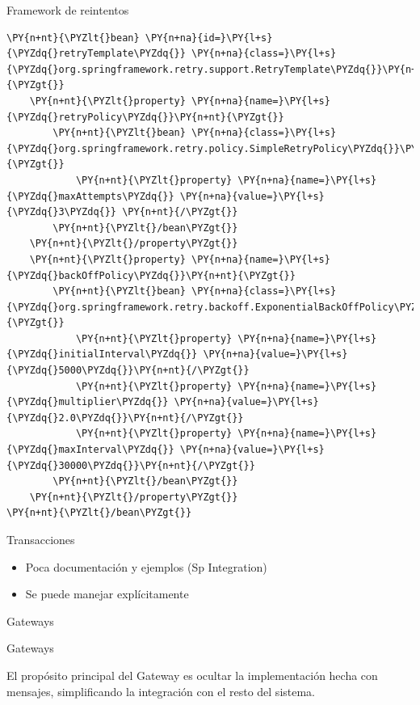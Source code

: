 \documentclass{beamer}
\begin{document}
\begin{frame}[fragile]{Framework de reintentos}
\begin{Verbatim}[fontsize=\tiny,commandchars=\\\{\}]
\PY{n+nt}{\PYZlt{}bean} \PY{n+na}{id=}\PY{l+s}{\PYZdq{}retryTemplate\PYZdq{}} \PY{n+na}{class=}\PY{l+s}{\PYZdq{}org.springframework.retry.support.RetryTemplate\PYZdq{}}\PY{n+nt}{\PYZgt{}}
    \PY{n+nt}{\PYZlt{}property} \PY{n+na}{name=}\PY{l+s}{\PYZdq{}retryPolicy\PYZdq{}}\PY{n+nt}{\PYZgt{}}
        \PY{n+nt}{\PYZlt{}bean} \PY{n+na}{class=}\PY{l+s}{\PYZdq{}org.springframework.retry.policy.SimpleRetryPolicy\PYZdq{}}\PY{n+nt}{\PYZgt{}}
            \PY{n+nt}{\PYZlt{}property} \PY{n+na}{name=}\PY{l+s}{\PYZdq{}maxAttempts\PYZdq{}} \PY{n+na}{value=}\PY{l+s}{\PYZdq{}3\PYZdq{}} \PY{n+nt}{/\PYZgt{}}
        \PY{n+nt}{\PYZlt{}/bean\PYZgt{}}
    \PY{n+nt}{\PYZlt{}/property\PYZgt{}}
    \PY{n+nt}{\PYZlt{}property} \PY{n+na}{name=}\PY{l+s}{\PYZdq{}backOffPolicy\PYZdq{}}\PY{n+nt}{\PYZgt{}}
        \PY{n+nt}{\PYZlt{}bean} \PY{n+na}{class=}\PY{l+s}{\PYZdq{}org.springframework.retry.backoff.ExponentialBackOffPolicy\PYZdq{}}\PY{n+nt}{\PYZgt{}}
            \PY{n+nt}{\PYZlt{}property} \PY{n+na}{name=}\PY{l+s}{\PYZdq{}initialInterval\PYZdq{}} \PY{n+na}{value=}\PY{l+s}{\PYZdq{}5000\PYZdq{}}\PY{n+nt}{/\PYZgt{}}
            \PY{n+nt}{\PYZlt{}property} \PY{n+na}{name=}\PY{l+s}{\PYZdq{}multiplier\PYZdq{}} \PY{n+na}{value=}\PY{l+s}{\PYZdq{}2.0\PYZdq{}}\PY{n+nt}{/\PYZgt{}}
            \PY{n+nt}{\PYZlt{}property} \PY{n+na}{name=}\PY{l+s}{\PYZdq{}maxInterval\PYZdq{}} \PY{n+na}{value=}\PY{l+s}{\PYZdq{}30000\PYZdq{}}\PY{n+nt}{/\PYZgt{}}
        \PY{n+nt}{\PYZlt{}/bean\PYZgt{}}
    \PY{n+nt}{\PYZlt{}/property\PYZgt{}}
\PY{n+nt}{\PYZlt{}/bean\PYZgt{}}
\end{Verbatim}
\end{frame}

\begin{frame}{Transacciones}
\begin{itemize}
\item Poca documentación y ejemplos (Sp Integration)
\item Se puede manejar explícitamente
\end{itemize}
\end{frame}

\begin{frame}{Gateways}
\par
\begin{center}
{\Large Gateways}
\end{center}
El propósito principal del Gateway es ocultar la implementación hecha con mensajes, simplificando la integración con el resto del sistema.
\end{frame}
\end{document}

